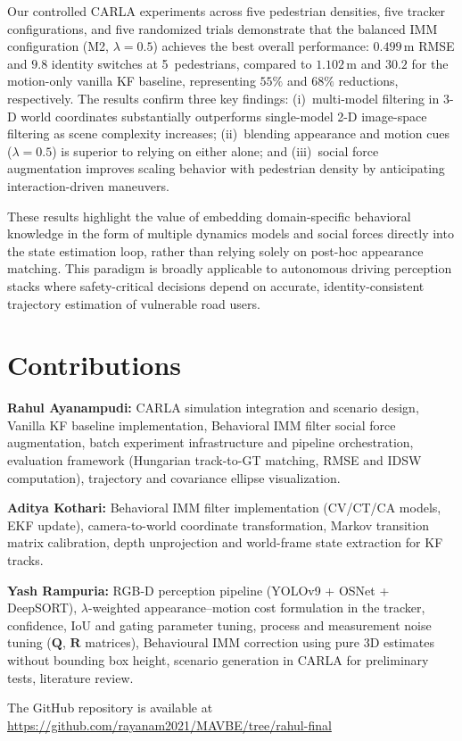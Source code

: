 \documentclass[conference]{IEEEtran}
\begin{document}
Our controlled CARLA experiments across five pedestrian densities, five tracker configurations, and five randomized trials demonstrate that the balanced IMM configuration (M2, $\lambda{=}0.5$) achieves the best overall performance: $0.499\,\text{m}$ RMSE and $9.8$ identity switches at 5~pedestrians, compared to $1.102\,\text{m}$ and $30.2$ for the motion-only vanilla KF baseline, representing $55\%$ and $68\%$ reductions, respectively. The results confirm three key findings: (i)~multi-model filtering in 3-D world coordinates substantially outperforms single-model 2-D image-space filtering as scene complexity increases; (ii)~blending appearance and motion cues ($\lambda{=}0.5$) is superior to relying on either alone; and (iii)~social force augmentation improves scaling behavior with pedestrian density by anticipating interaction-driven maneuvers.

These results highlight the value of embedding domain-specific behavioral knowledge in the form of multiple dynamics models and social forces directly into the state estimation loop, rather than relying solely on post-hoc appearance matching. This paradigm is broadly applicable to autonomous driving perception stacks where safety-critical decisions depend on accurate, identity-consistent trajectory estimation of vulnerable road users.

\section*{Contributions}

\textbf{Rahul Ayanampudi:} CARLA simulation integration and scenario design, Vanilla KF baseline implementation, Behavioral IMM filter social force augmentation, batch experiment infrastructure and pipeline orchestration, evaluation framework (Hungarian track-to-GT matching, RMSE and IDSW computation), trajectory and covariance ellipse visualization.

\textbf{Aditya Kothari:} Behavioral IMM filter implementation (CV/CT/CA models, EKF update), camera-to-world coordinate transformation, Markov transition matrix calibration, depth unprojection and world-frame state extraction for KF tracks.

\textbf{Yash Rampuria:} RGB-D perception pipeline (YOLOv9 + OSNet + DeepSORT), $\lambda$-weighted appearance--motion cost formulation in the tracker, confidence, IoU and gating parameter tuning, process and measurement noise tuning ($\mathbf{Q}$, $\mathbf{R}$ matrices), Behavioural IMM correction using pure 3D estimates without bounding box height, scenario generation in CARLA for preliminary tests, literature review.

The GitHub repository is available at \url{https://github.com/rayanam2021/MAVBE/tree/rahul-final}




\end{document}
